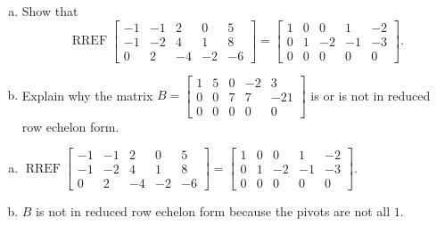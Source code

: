 
\begin{exerciseStatement}

\begin{enumerate}[(a)]
\item Show that \[\operatorname{RREF} \left[\begin{array}{ccccc}
-1 & -1 & 2 & 0 & 5 \\
-1 & -2 & 4 & 1 & 8 \\
0 & 2 & -4 & -2 & -6
\end{array}\right] = \left[\begin{array}{ccccc}
1 & 0 & 0 & 1 & -2 \\
0 & 1 & -2 & -1 & -3 \\
0 & 0 & 0 & 0 & 0
\end{array}\right] .\]
\item Explain why the matrix \(B= \left[\begin{array}{ccccc}
1 & 5 & 0 & -2 & 3 \\
0 & 0 & 7 & 7 & -21 \\
0 & 0 & 0 & 0 & 0
\end{array}\right] \) is or is not in reduced row echelon form.
\end{enumerate}
    
\end{exerciseStatement}
    
\begin{exerciseAnswer} 

\begin{enumerate}[(a)]
\item \(\operatorname{RREF} \left[\begin{array}{ccccc}
-1 & -1 & 2 & 0 & 5 \\
-1 & -2 & 4 & 1 & 8 \\
0 & 2 & -4 & -2 & -6
\end{array}\right] = \left[\begin{array}{ccccc}
1 & 0 & 0 & 1 & -2 \\
0 & 1 & -2 & -1 & -3 \\
0 & 0 & 0 & 0 & 0
\end{array}\right] .\)
\item \(B\) is not in reduced row echelon form because the pivots are not all \(1\). 
\end{enumerate}
    
\end{exerciseAnswer}
    
